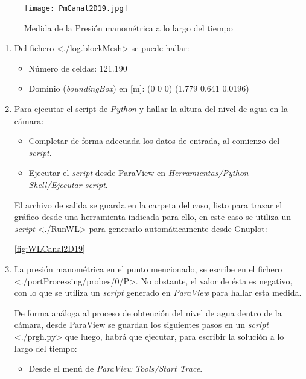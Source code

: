\begin{figure}
\centering
\texttt{[image: PmCanal2D19.jpg]}
\caption{Medida de la Presión manométrica a lo largo del tiempo}
\label{fig:PmCanal2D19}
\end{figure}

\begin{enumerate}
\def\labelenumi{\arabic{enumi}.}
\item
  Del fichero \textless{}./log.blockMesh\textgreater{} se puede hallar:

  \begin{itemize}
  \item
    Número de celdas: 121.190
  \item
    Dominio (\emph{boundingBox}) en {[}m{]}: (0 0 0) (1.779 0.641
    0.0196)
  \end{itemize}
\item
  Para ejecutar el script de \emph{Python} y hallar la altura del nivel
  de agua en la cámara:

  \begin{itemize}
  \item
    Completar de forma adecuada los datos de entrada, al comienzo del
    \emph{script}.
  \item
    Ejecutar el \emph{script} desde ParaView en
    \emph{Herramientas/Python Shell/Ejecutar script}.
  \end{itemize}

  El archivo de salida se guarda en la carpeta del caso, listo para
  trazar el gráfico desde una herramienta indicada para ello, en este
  caso se utiliza un \emph{script} \textless{}./RunWL\textgreater{} para
  generarlo automáticamente desde Gnuplot:

  \autoref{fig:WLCanal2D19}

\item
  La presión manométrica en el punto mencionado, se escribe en el
  fichero \textless{}./portProcessing/probes/0/P\textgreater{}. No
  obstante, el valor de ésta es negativo, con lo que se utiliza un
  \emph{script} generado en \emph{ParaView} para hallar esta medida.

  De forma análoga al proceso de obtención del nivel de agua dentro de
  la cámara, desde ParaView se guardan los siguientes pasos en un
  \emph{script} \textless{}./prgh.py\textgreater{} que luego, habrá que
  ejecutar, para escribir la solución a lo largo del tiempo:

  \begin{itemize}
  \item
    Desde el menú de \emph{ParaView} \emph{Tools/Start Trace}.


\end{itemize}
\end{enumerate}
